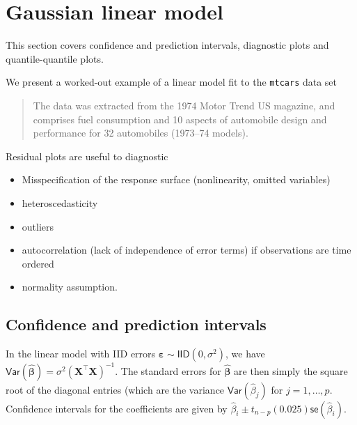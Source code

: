 \documentclass[]{book}
\providecommand{\tightlist}{%
  \setlength{\itemsep}{0pt}\setlength{\parskip}{0pt}}
\theoremstyle{definition}
\theoremstyle{definition}
\theoremstyle{definition}
\theoremstyle{remark}
\begin{document}
\hypertarget{gaussian-linear-model}{%
\chapter{Gaussian linear model}\label{gaussian-linear-model}}

This section covers confidence and prediction intervals, diagnostic
plots and quantile-quantile plots.

We present a worked-out example of a linear model fit to the
\texttt{mtcars} data set

\begin{quote}
The data was extracted from the 1974 Motor Trend US magazine, and
comprises fuel consumption and 10 aspects of automobile design and
performance for 32 automobiles (1973--74 models).
\end{quote}

Residual plots are useful to diagnostic

\begin{itemize}
\tightlist
\item
  Misspecification of the response surface (nonlinearity, omitted
  variables)
\item
  heteroscedasticity
\item
  outliers
\item
  autocorrelation (lack of independence of error terms) if observations
  are time ordered
\item
  normality assumption.
\end{itemize}

\hypertarget{confidence-and-prediction-intervals}{%
\section{Confidence and prediction
intervals}\label{confidence-and-prediction-intervals}}

In the linear model with IID errors
\(\boldsymbol{\varepsilon}\sim \mathsf{IID}(0, \sigma^2)\), we have
\(\mathsf{Var}(\hat{\boldsymbol{\beta}}) = \sigma^2(\mathbf{X}^\top\mathbf{X})^{-1}\).
The standard errors for \(\hat{\boldsymbol{\beta}}\) are then simply the
square root of the diagonal entries (which are the variance
\(\mathsf{Var}(\hat{\beta}_j)\) for \(j=1, \ldots, p\). Confidence
intervals for the coefficients are given by
\(\hat{\beta}_i \pm t_{n-p}({0.025})\mathsf{se}(\hat{\beta}_i)\).
\end{document}
